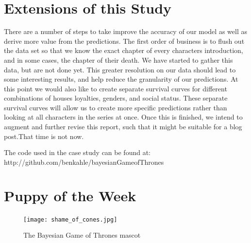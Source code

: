 \documentclass{article}
\begin{document}
\newpage

\section{Extensions of this Study}
There are a number of steps to take improve the accuracy of our model as well as derive more value from the predictions. The first order of business is to flush out the data set so that we know the exact chapter of every characters introduction, and in some cases, the chapter of their death. We have started to gather this data, but are not done yet. This greater resolution on our data should lead to some interesting results, and help reduce the granularity of our predictions. At this point we would also like to create separate survival curves for different combinations of houses loyalties, genders, and social status. These separate survival curves will allow us to create more specific predictions rather than looking at all characters in the series at once. Once this is finished, we intend to augment and further revise this report, such that it might be suitable for a blog post.That time is not now.

The code used in the case study can be found at: \\
http://github.com/benkahle/bayesianGameofThrones

\section{Puppy of the Week}
\begin{figure}[ht!]
\centering
\texttt{[image: shame\_of\_cones.jpg]}
\caption{The Bayesian Game of Thrones mascot}
\end{figure}
\end{document}
